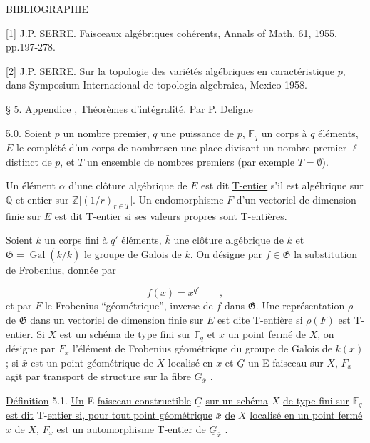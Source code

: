 \underline{BIBLIOGRAPHIE}

[1]  J.P.  SERRE.  Faisceaux algébriques cohérents, Annals of Math, 61, 1955, pp.197-278.

[2]  J.P.  SERRE.  Sur la topologie des variétés algébriques en caractéristique $p$, dans Symposium Internacional de topologia algebraica, Mexico 1958.




§ 5. \underline{Appendice} , \underline{Théorèmes d'intégralité}. Par P. Deligne

5.0. Soient $p$ un nombre premier, $q$ une puissance de $p$, $\mathbb{F}_q$ un corps à $q$ éléments, $E$ le complété d'un corps de nombresen une place divisant un nombre premier $\ell$ distinct de $p$, et $T$ un ensemble de nombres premiers (par exemple $T = \emptyset$).

Un élément $\alpha$ d'une clôture algébrique de $E$ est dit \underline{T-entier} s'il est algébrique sur $\mathbb{Q}$ et entier sur $\mathbb{Z}\bigl[(1/r)_{r \in T}\bigr]$. Un endomorphisme $F$ d'un vectoriel de dimension finie sur $E$ est dit \underline{T-entier} si ses valeurs propres sont T-entières.

Soient $k$ un corps fini à $q'$ éléments, $\bar{k}$ une clôture algébrique de $k$ et $\mathfrak{G} = \operatorname{Gal}(\bar{k}/k)$ le groupe de Galois de $k$. On désigne par $f \in \mathfrak{G}$ la substitution de Frobenius, donnée par

\begin{equation*}
f(x) = x^{q'} \qquad ,
\end{equation*}
et par $F$ le Frobenius ``géométrique'', inverse de $f$ dans $\mathfrak{G}$. Une représentation $\rho$ de $\mathfrak{G}$ dans un vectoriel de dimension finie sur $E$ est dite T-entière si $\rho(F)$ est T-entier. Si $X$ est un schéma de type fini sur $\mathbb{F}_q$ et $x$ un point fermé de $X$, on désigne par $F_x$ l'élément de Frobenius géométrique du groupe de Galois de $k(x)$ ; si $\bar{x}$ est un point géométrique de $X$ localisé en $x$ et $\underline{G}$ un E-faisceau sur $X$, $F_x$ agit par transport de structure sur la fibre $G_{\bar{x}}$ .

\underline{Définition} 5.1. \underline{Un} E-\underline{faisceau constructible} $\underline{G}$ \underline{sur un schéma} $X$ \underline{de type fini sur} $\mathbb{F}_q$ \underline{est dit} T-\underline{entier si, pour tout point géométrique} $\bar{x}$ \underline{de} $X$ \underline{localisé en un point fermé} $x$ \underline{de} $X$, $F_x$ \underline{est un automorphisme} T-\underline{entier de} $\underline{G}_{\bar{x}}$ .


